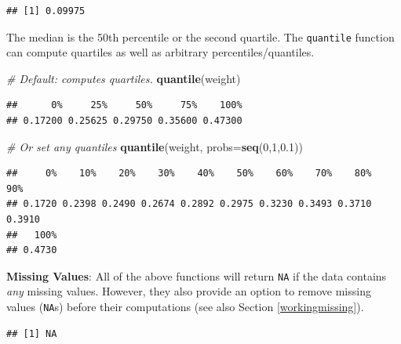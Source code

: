 \documentclass[]{book}
\newenvironment{Shaded}{\begin{snugshade}}{\end{snugshade}}
\newcommand{\CommentTok}[1]{\textcolor[rgb]{0.56,0.35,0.01}{\textit{#1}}}
\newcommand{\DataTypeTok}[1]{\textcolor[rgb]{0.13,0.29,0.53}{#1}}
\newcommand{\DecValTok}[1]{\textcolor[rgb]{0.00,0.00,0.81}{#1}}
\newcommand{\FloatTok}[1]{\textcolor[rgb]{0.00,0.00,0.81}{#1}}
\newcommand{\KeywordTok}[1]{\textcolor[rgb]{0.13,0.29,0.53}{\textbf{#1}}}
\newcommand{\NormalTok}[1]{#1}
\newcommand{\OperatorTok}[1]{\textcolor[rgb]{0.81,0.36,0.00}{\textbf{#1}}}
\newcommand{\OtherTok}[1]{\textcolor[rgb]{0.56,0.35,0.01}{#1}}
\begin{document}
\begin{verbatim}
## [1] 0.09975
\end{verbatim}

The median is the 50th percentile or the second quartile. The \texttt{quantile} function can compute quartiles as well as arbitrary percentiles/quantiles.

\begin{Shaded}
\begin{Highlighting}[]
\CommentTok{# Default: computes quartiles.}
\KeywordTok{quantile}\NormalTok{(weight)}
\end{Highlighting}
\end{Shaded}

\begin{verbatim}
##      0%     25%     50%     75%    100% 
## 0.17200 0.25625 0.29750 0.35600 0.47300
\end{verbatim}

\begin{Shaded}
\begin{Highlighting}[]
\CommentTok{# Or set any quantiles}
\KeywordTok{quantile}\NormalTok{(weight, }\DataTypeTok{probs=}\KeywordTok{seq}\NormalTok{(}\DecValTok{0}\NormalTok{,}\DecValTok{1}\NormalTok{,}\FloatTok{0.1}\NormalTok{))}
\end{Highlighting}
\end{Shaded}

\begin{verbatim}
##     0%    10%    20%    30%    40%    50%    60%    70%    80%    90% 
## 0.1720 0.2398 0.2490 0.2674 0.2892 0.2975 0.3230 0.3493 0.3710 0.3910 
##   100% 
## 0.4730
\end{verbatim}

\textbf{Missing Values}: All of the above functions will return \texttt{NA} if the data contains \emph{any} missing values. However, they also provide an option to remove missing values (\texttt{NA}s) before their computations (see also Section \ref{workingmissing}).

\begin{Shaded}
\end{Shaded}

\begin{verbatim}
## [1] NA
\end{verbatim}

\begin{Shaded}
\end{Shaded}
\end{document}
